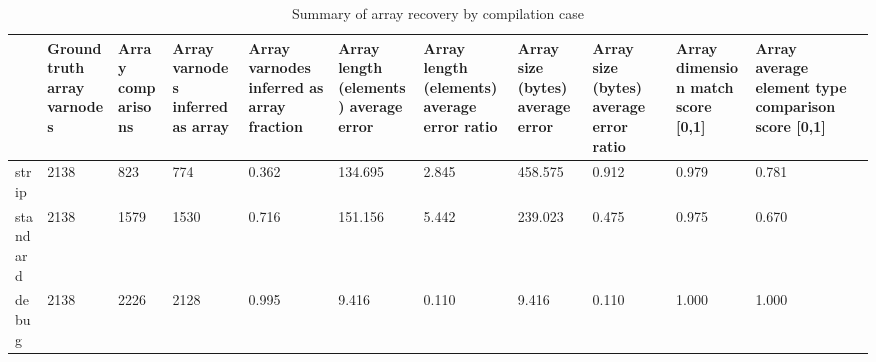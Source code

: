 \begin{table*}[t]
\centering
\caption{Summary of array recovery by compilation case}
\label{table*:opts-array-comparisons-summary}
\begin{tabular}{lp{1.1cm}p{1.1cm}p{1.1cm}p{1.1cm}p{1.1cm}p{1.1cm}p{1.1cm}p{1.1cm}p{1.1cm}p{1.1cm}p{1.1cm}}
\toprule
{} &  Ground truth array varnodes &  Array comparisons &  Array varnodes inferred as array &  Array varnodes inferred as array fraction &  Array length (elements) average error &  Array length (elements) average error ratio &  Array size (bytes) average error &  Array size (bytes) average error ratio &  Array dimension match score [0,1] &  Array average element type comparison score [0,1] \\
\midrule
strip    &                         2138 &                823 &                               774 &                                      0.362 &                                134.695 &                                        2.845 &                           458.575 &                                   0.912 &                              0.979 &                                              0.781 \\
standard &                         2138 &               1579 &                              1530 &                                      0.716 &                                151.156 &                                        5.442 &                           239.023 &                                   0.475 &                              0.975 &                                              0.670 \\
debug    &                         2138 &               2226 &                              2128 &                                      0.995 &                                  9.416 &                                        0.110 &                             9.416 &                                   0.110 &                              1.000 &                                              1.000 \\
\bottomrule
\end{tabular}
\end{table*}
